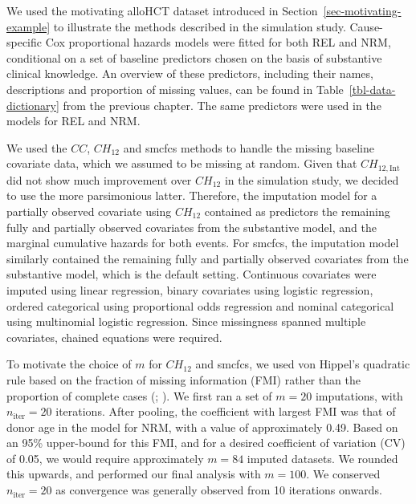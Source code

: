 \documentclass[
  letterpaper,
  paper=240mm:170mm,
  twoside=true,
  open=right,
  fontsize=10pt,
  pagesize=false,
  BCOR=15mm,
  DIV=14,
  headinclude=true,
  footinclude=false,
  headsepline=on]{scrbook}
\begin{document}
We used the motivating alloHCT dataset introduced in
Section~\ref{sec-motivating-example} to illustrate the methods described
in the simulation study. Cause-specific Cox proportional hazards models
were fitted for both REL and NRM, conditional on a set of baseline
predictors chosen on the basis of substantive clinical knowledge. An
overview of these predictors, including their names, descriptions and
proportion of missing values, can be found in
Table~\ref{tbl-data-dictionary} from the previous chapter. The same
predictors were used in the models for REL and NRM.

We used the \(CC\), \(CH_{12}\) and smcfcs methods to handle the missing
baseline covariate data, which we assumed to be missing at random. Given
that \(CH_{12,\text{Int}}\) did not show much improvement over
\(CH_{12}\) in the simulation study, we decided to use the more
parsimonious latter. Therefore, the imputation model for a partially
observed covariate using \(CH_{12}\) contained as predictors the
remaining fully and partially observed covariates from the substantive
model, and the marginal cumulative hazards for both events. For smcfcs,
the imputation model similarly contained the remaining fully and
partially observed covariates from the substantive model, which is the
default setting. Continuous covariates were imputed using linear
regression, binary covariates using logistic regression, ordered
categorical using proportional odds regression and nominal categorical
using multinomial logistic regression. Since missingness spanned
multiple covariates, chained equations were required.

To motivate the choice of \(m\) for \(CH_{12}\) and smcfcs, we used von
Hippel's quadratic rule based on the fraction of missing information
(FMI) rather than the proportion of complete cases
(; ). We first ran a set of \(m = 20\) imputations, with
\(n_{\text{iter}} = 20\) iterations. After pooling, the coefficient with
largest FMI was that of donor age in the model for NRM, with a value of
approximately 0.49. Based on an 95\% upper-bound for this FMI, and for a
desired coefficient of variation (CV) of 0.05, we would require
approximately \(m = 84\) imputed datasets. We rounded this upwards, and
performed our final analysis with \(m = 100\). We conserved
\(n_{\text{iter}} = 20\) as convergence was generally observed from 10
iterations onwards.
\end{document}
